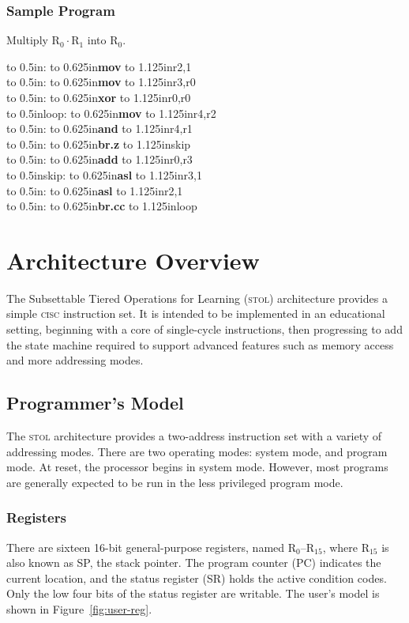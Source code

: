 \documentclass[12pt,english]{book}
\newcommand*{\asmstyle}{\noindent\ttfamily\selectfont\small}
\newcommand*{\asmline}[3][]{%
\null\hbox to 0.5in{\ifx#1\empty\else{#1}:\fi\hss}%
\hbox to 0.625in{\textbf{#2}\hss}%
\hbox to 1.125in{#3\hss}}
\begin{document}
\begin{minipage}[t]{0.35\textwidth}
\subsection*{Sample Program}
Multiply \(\text{R}_0\cdot\text{R}_1\) into \(\text{R}_0\).

{\asmstyle
\asmline{mov}{r2,1}\\
\asmline{mov}{r3,r0}\\
\asmline{xor}{r0,r0}\\
\asmline[loop]{mov}{r4,r2}\\
\asmline{and}{r4,r1}\\
\asmline{br.z}{skip}\\
\asmline{add}{r0,r3}\\
\asmline[skip]{asl}{r3,1}\\
\asmline{asl}{r2,1}\\
\asmline{br.cc}{loop}}
\end{minipage}%
%
\let\center\ogcenter
\let\endcenter\ogendcenter
\mainmatter\pagestyle{plain}

\chapter{Architecture Overview}\label{ch:overview}
The Subsettable Tiered Operations for Learning (\textsc{stol})
architecture provides a simple \textsc{cisc} instruction set.
It is intended to be implemented in an educational setting,
beginning with a core of single-cycle instructions,
then progressing to add the state machine required
to support advanced features such as
memory access and more addressing modes.

\section{Programmer's Model}
The \textsc{stol} architecture provides a two-address instruction set
with a variety of addressing modes.
There are two operating modes: system mode, and program mode.
At reset, the processor begins in system mode.
However, most programs are generally expected
to be run in the less privileged program mode.

\subsection{Registers}
There are sixteen 16-bit general-purpose registers,
named \(\text{R}_0\)--\(\text{R}_{15}\),
where \(\text{R}_{15}\) is also known as SP, the stack pointer.
The program counter (PC) indicates the current location,
and the status register (SR) holds the active condition codes.
Only the low four bits of the status register are writable.
The user's model is shown in Figure~\ref{fig:user-reg}.
\end{document}
